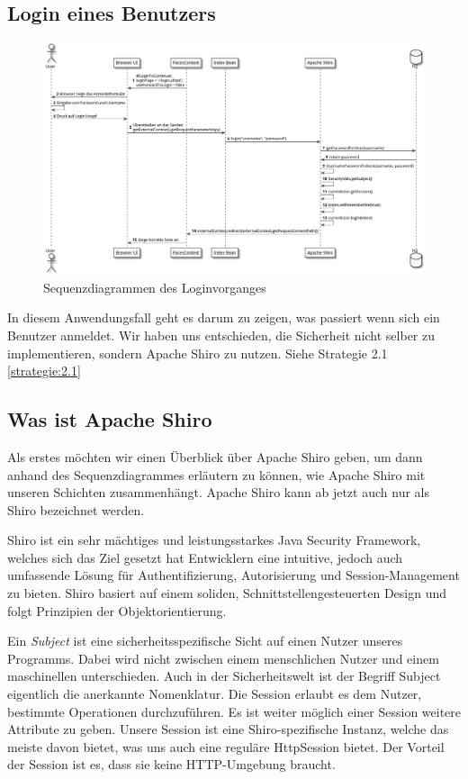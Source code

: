 \documentclass[enabledeprecatedfontcommands,fontsize=12pt,paper=a4,twoside]{scrartcl}
\begin{document}
{\subsection{Login eines Benutzers}
\begin{figure}[H]
  \includegraphics[width=\linewidth]{UML/aw/erstbenutzung.png}
  \caption{Sequenzdiagrammen des Loginvorganges}
  \label{fig:erstbenutzung.png}
\end{figure}

In diesem Anwendungsfall geht es darum zu zeigen, was passiert wenn sich ein
Benutzer anmeldet. Wir haben uns entschieden, die Sicherheit nicht selber zu
implementieren, sondern Apache Shiro zu nutzen. Siehe Strategie 2.1 \ref{strategie:2.1}

\subsection{Was ist Apache Shiro}
Als erstes möchten wir einen Überblick über Apache Shiro geben, um dann anhand
des Sequenzdiagrammes erläutern zu können, wie Apache Shiro mit unseren Schichten
zusammenhängt. Apache Shiro kann ab jetzt auch nur als Shiro bezeichnet werden.

Shiro ist ein sehr mächtiges und leistungsstarkes Java Security Framework,
welches sich das Ziel gesetzt hat Entwicklern eine intuitive, jedoch auch
umfassende Lösung für Authentifizierung, Autorisierung und Session-Management zu
bieten. Shiro basiert auf einem soliden, Schnittstellengesteuerten Design und
folgt Prinzipien der Objektorientierung.

Ein \emph{Subject} ist eine sicherheitsspezifische Sicht auf einen Nutzer
unseres Programms. Dabei wird nicht zwischen einem menschlichen Nutzer und
einem maschinellen unterschieden. Auch in der Sicherheitswelt ist der Begriff
Subject eigentlich die anerkannte Nomenklatur. Die Session erlaubt es dem
Nutzer, bestimmte Operationen durchzuführen. Es ist weiter möglich einer Session
weitere Attribute zu geben. Unsere Session ist eine Shiro-spezifische Instanz,
welche das meiste davon bietet,  was uns auch eine reguläre HttpSession
bietet. Der Vorteil der Session ist es, dass sie keine HTTP-Umgebung braucht.

}
\end{document}
